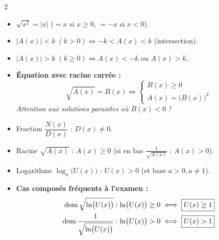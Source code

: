 {\begin{multicols}{2}
\vspace{3pt}
\begin{itemize}[leftmargin=1.2em, itemsep=1.5pt, topsep=2pt]
    \item $\sqrt{x^2} = |x|$ ($= x$ si $x \ge 0$, $= -x$ si $x < 0$).
    \item $|A(x)| < k \;(k > 0) \iff -k < A(x) < k$ (intersection).
    \item $|A(x)| > k \;(k \ge 0) \iff A(x) < -k \text{ ou } A(x) > k$.
    \item \textbf{Équation avec racine carrée :}
    \[
        \boxed{\sqrt{A(x)} = B(x) \iff \begin{cases} B(x) \ge 0 \\ A(x) = \bigl(B(x)\bigr)^2 \end{cases}}
    \]
    \emph{Attention aux solutions parasites où $B(x) < 0$ !}
\end{itemize}

\columnbreak

\begin{itemize}[leftmargin=1.2em, itemsep=1.5pt, topsep=2pt]
    \item Fraction $\dfrac{N(x)}{D(x)}$ : $D(x) \neq 0$.
    \item Racine $\sqrt{A(x)}$ : $A(x) \ge 0$ (si en bas $\frac{1}{\sqrt{A(x)}}$ : $A(x) > 0$).
    \item Logarithme $\log_a\bigl(U(x)\bigr)$ : $U(x) > 0$ (et base $a > 0, a \neq 1$).
    \item \textbf{Cas composés fréquents à l'examen :}
    \begin{align*}
        \operatorname{dom}\sqrt{\ln\bigl(U(x)\bigr)} &: \ln\bigl(U(x)\bigr) \ge 0 \iff \boxed{U(x) \ge 1} \\
        \operatorname{dom}\frac{1}{\sqrt{\ln\bigl(U(x)\bigr)}} &: \ln\bigl(U(x)\bigr) > 0 \iff \boxed{U(x) > 1}
    \end{align*}
\end{itemize}


\end{multicols}}
